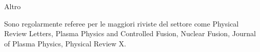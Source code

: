 \begin{cvblock}{Altro}
\end{cvblock}
Sono regolarmente referee per le maggiori riviste del settore come Physical Review
Letters, Plasma Physics and Controlled Fusion, Nuclear Fusion, Journal
of Plasma Physics, Physical Review X. \\

